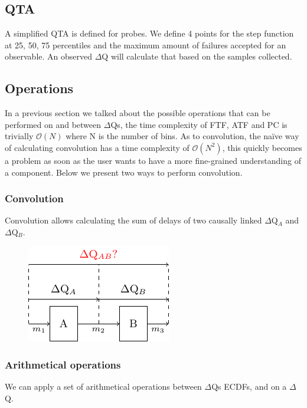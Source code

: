     \subsection{QTA}
        A simplified QTA is defined for probes. We define 4 points for the step function at 25, 50, 75 percentiles and the maximum amount of failures accepted for an observable. An observed $\Delta$Q will calculate that based on the samples collected. 

    \subsection{Operations}
    In a previous section we talked about the possible operations that can be performed on and between $\Delta$Qs, the time complexity of FTF, ATF and PC is trivially $\mathcal{O}(N)$ where N is the number of bins. As to convolution, the naïve way of calculating convolution has a time complexity of $\mathcal{O}(N^2)$, this quickly becomes a problem as soon as the user wants to have a more fine-grained understanding of a component. Below we present two ways to perform convolution.

        \subsubsection{Convolution} 
            Convolution allows calculating the sum of delays of two causally linked $\Delta$Q$_A$ and $\Delta$Q$_B$. 
        \begin{figure}[H]
            \begin{center}
                \includegraphics{tikz/comb_dq_comp.pdf}
            \end{center}
        \end{figure}

\subsubsection{Arithmetical operations}
        We can apply a set of arithmetical operations between $\Delta$Qs ECDFs, and on a $\Delta$Q.
